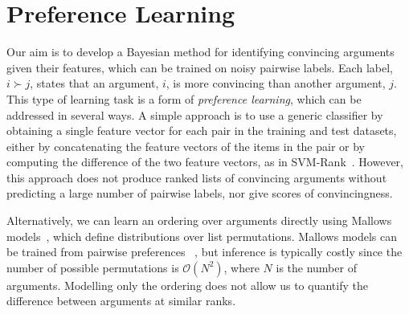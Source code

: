 \section{Preference Learning}\label{sec:pref_learning}

Our aim is to develop a Bayesian method for identifying convincing arguments 
given their features, which can be trained on noisy pairwise labels.
Each label, $i \succ j$, states that an argument, $i$, is more convincing than another argument, $j$. 
This type of learning task is a form of \emph{preference learning}, which can be addressed in several ways.
A simple approach is to use a generic classifier by
obtaining a single feature vector for each pair in the training and test datasets,
either by concatenating the feature vectors of the items in the pair 
or by computing the difference of the two feature vectors, as in SVM-Rank~\cite{joachims2002optimizing}. 
However, this approach does not produce ranked lists of convincing arguments without predicting a large number of pairwise labels, nor give scores of convincingness. %

Alternatively, we can learn an ordering over arguments directly using Mallows models~\cite{mallows1957non},
which define distributions over list permutations.  
Mallows models can be trained from pairwise preferences 
~\cite{lu2011learning}, but inference is typically costly
since the number of possible permutations is $\mathcal{O}(N^2)$, 
where $N$ is the number of arguments. 
Modelling only the ordering does not allow us to quantify 
the difference between arguments at similar ranks.

